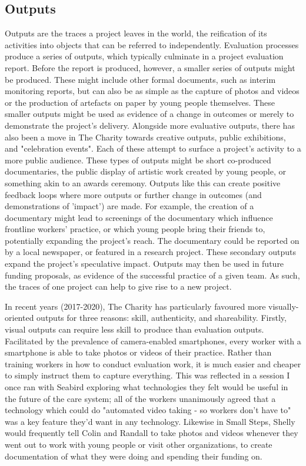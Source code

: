 \subsection{Outputs}
\label{subsec:6-3-2-outputs}
Outputs are the traces a project leaves in the world, the reification of its activities into objects that can be referred to independently. Evaluation processes produce a series of outputs, which typically culminate in a project evaluation report. Before the report is produced, however, a smaller series of outputs might be produced. These might include other formal documents, such as interim monitoring reports, but can also be as simple as the capture of photos and videos or the production of artefacts on paper by young people themselves. These smaller outputs might be used as evidence of a change in outcomes or merely to demonstrate the project's delivery.  Alongside more evaluative outputs, there has also been a move in The Charity towards creative outputs, public exhibitions, and "celebration events". Each of these attempt to surface a project's activity to a more public audience. These types of outputs might be short co-produced documentaries, the public display of artistic work created by young people, or something akin to an awards ceremony. Outputs like this can create positive feedback loops where more outputs or further change in outcomes (and demonstrations of 'impact') are made. For example, the creation of a documentary might lead to screenings of the documentary which influence frontline workers' practice, or which young people bring their friends to, potentially expanding the project's reach. The documentary could be reported on by a local newspaper, or featured in a research project. These secondary outputs expand the project's speculative impact. Outputs may then be used in future funding proposals, as evidence of the successful practice of a given team. As such, the traces of one project can help to give rise to a new project.

In recent years (2017-2020), The Charity has particularly favoured more visually-oriented outputs for three reasons: skill, authenticity, and shareability. Firstly, visual outputs can require less skill to produce than evaluation outputs. Facilitated by the prevalence of camera-enabled smartphones, every worker with a smartphone is able to take photos or videos of their practice. Rather than training workers in how to conduct evaluation work, it is much easier and cheaper to simply instruct them to capture everything. This was reflected in a session I once ran with Seabird exploring what technologies they felt would be useful in the future of the care system; all of the workers unanimously agreed that a technology which could do "automated video taking - so workers don’t have to" was a key feature they'd want in any technology. Likewise in Small Steps, Shelly would frequently tell Colin and Randall to take photos and videos whenever they went out to work with young people or visit other organizations, to create documentation of what they were doing and spending their funding on. 

